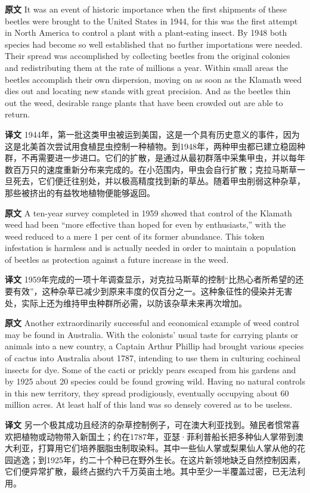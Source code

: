 \documentclass[UTF8,zihao=-4]{ctexart}
\begin{document}
\noindent\textbf{原文} It was an event of historic importance when the first shipments of these beetles were brought to the United States in 1944, for this was the first attempt in North America to control a plant with a plant-eating insect. By 1948 both species had become so well established that no further importations were needed. Their spread was accomplished by collecting beetles from the original colonies and redistributing them at the rate of millions a year. Within small areas the beetles accomplish their own dispersion, moving on as soon as the Klamath weed dies out and locating new stands with great precision. And as the beetles thin out the weed, desirable range plants that have been crowded out are able to return.
\par
\noindent\textbf{译文} 1944年，第一批这类甲虫被运到美国，这是一个具有历史意义的事件，因为这是北美首次尝试用食植昆虫控制一种植物。到1948年，两种甲虫都已建立稳固种群，不再需要进一步进口。它们的扩散，是通过从最初群落中采集甲虫，并以每年数百万只的速度重新分布来完成的。在小范围内，甲虫会自行扩散；克拉马斯草一旦死去，它们便迁往别处，并以极高精度找到新的草丛。随着甲虫削弱这种杂草，那些被挤出的有益牧地植物便能够返回。
\par\medskip

\noindent\textbf{原文} A ten-year survey completed in 1959 showed that control of the Klamath weed had been ``more effective than hoped for even by enthusiasts,'' with the weed reduced to a mere 1 per cent of its former abundance. This token infestation is harmless and is actually needed in order to maintain a population of beetles as protection against a future increase in the weed.
\par
\noindent\textbf{译文} 1959年完成的一项十年调查显示，对克拉马斯草的控制“比热心者所希望的还要有效”，这种杂草已减少到原来丰度的仅百分之一。这种象征性的侵染并无害处，实际上还为维持甲虫种群所必需，以防该杂草未来再次增加。
\par\medskip

\noindent\textbf{原文} Another extraordinarily successful and economical example of weed control may be found in Australia. With the colonists' usual taste for carrying plants or animals into a new country, a Captain Arthur Phillip had brought various species of cactus into Australia about 1787, intending to use them in culturing cochineal insects for dye. Some of the cacti or prickly pears escaped from his gardens and by 1925 about 20 species could be found growing wild. Having no natural controls in this new territory, they spread prodigiously, eventually occupying about 60 million acres. At least half of this land was so densely covered as to be useless.
\par
\noindent\textbf{译文} 另一个极其成功且经济的杂草控制例子，可在澳大利亚找到。殖民者惯常喜欢把植物或动物带入新国土；约在1787年，亚瑟·菲利普船长把多种仙人掌带到澳大利亚，打算用它们培养胭脂虫制取染料。其中一些仙人掌或梨果仙人掌从他的花园逃逸；到1925年，约二十个种已在野外生长。在这片新领地缺乏自然控制因素，它们便异常扩散，最终占据约六千万英亩土地。其中至少一半覆盖过密，已无法利用。
\par\medskip
\end{document}
